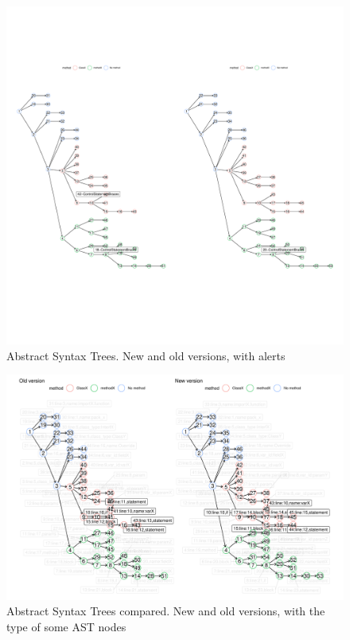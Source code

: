 \documentclass[
]{article}
\begin{document}
\begin{figure}[H]
\includegraphics[width=1\linewidth]{match_algorithm_description_files/figure-latex/unnamed-chunk-4-1} \caption{Abstract Syntax Trees. New and old versions, with alerts \label{AST_compare_id_alerts}}\label{fig:unnamed-chunk-4}
\end{figure}

\normalsize

\small

\begin{figure}[H]
\includegraphics[width=1\linewidth]{match_algorithm_description_files/figure-latex/unnamed-chunk-5-1} \caption{Abstract Syntax Trees compared. New and old versions, with the type of some AST nodes \label{AST_compare}}\label{fig:unnamed-chunk-5}
\end{figure}
\end{document}
